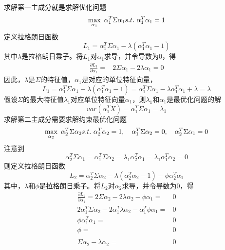 \documentclass[lang=cn,11pt,a4paper,cite=authoryear]{elegantpaper}
\begin{document}
求解第一主成分就是求解优化问题
\begin{equation}
\max_{\alpha_1}\ \alpha_1^T\Sigma\alpha_1\\
s.t.\ \alpha_1^T\alpha_1=1
\end{equation}
定义拉格朗日函数
\begin{equation}
L_1=\alpha_1^T\Sigma\alpha_1-\lambda(\alpha_1^T\alpha_1-1)
\end{equation}
其中$\lambda$是拉格朗日乘子。将$L_1$对$\alpha_1$求导，并令导数为$0$，得
\begin{equation}
\begin{aligned}
	\frac{\partial L_1}{\partial \alpha_1}=&2\Sigma\alpha_1-2\lambda\alpha_1=0
\end{aligned}
\end{equation}
因此，$\lambda$是$\Sigma$的特征值，$\alpha_1$是对应的单位特征向量，
\begin{equation}
L_1 =\alpha_1^T\Sigma\alpha_1-\lambda(\alpha_1^T\alpha_1-1)=\alpha_1^T\Sigma\alpha_1-\lambda\alpha_1^T\alpha_1+\lambda= \lambda
\end{equation}
假设$\Sigma$的最大特征值$\lambda_1$对应单位特征向量$\alpha_1$，则$\lambda_1$和$\alpha_1$是最优化问题的解
\begin{equation}
var(\alpha_1^TX)=\alpha_1^T\Sigma\alpha_1=\lambda_1
\end{equation}
求解第二主成分需要求解约束最优化问题
\begin{equation}
\max_{\alpha_2}\ \alpha_2^T\Sigma\alpha_2\\
s.t.\ \alpha_2^T\alpha_2=1, \quad \alpha_1^T\Sigma\alpha_2=0, \quad \alpha_2^T\Sigma\alpha_1=0
\end{equation}
注意到
\begin{equation}
\alpha_2^T\Sigma\alpha_1=\alpha_1^T\Sigma\alpha_2=\lambda_1\alpha_2^T\alpha_1=\lambda_1\alpha_1^T\alpha_2=0
\end{equation}
则定义拉格朗日函数
\begin{equation}
L_2=\alpha_2^T\Sigma\alpha_2-\lambda(\alpha_2^T\alpha_2-1)-\phi\alpha_2^T\alpha_1
\end{equation}
其中，$\lambda$和$\phi$是拉格朗日乘子。将$L_2$对$\alpha_2$求导，并令导数为$0$，得
\begin{equation}
\begin{aligned}
	\frac{\partial L_2}{\partial \alpha_1}=2\Sigma\alpha_2-2\lambda\alpha_2-\phi\alpha_1=&0\\
	2\alpha_1^T\Sigma\alpha_2-2\alpha_1^T\lambda\alpha_2-\alpha_1^T\phi\alpha_1=&0\\
	\phi\alpha_1^T\alpha_1=&0\\
	\phi=&0\\
	\\
	\Sigma\alpha_2-\lambda\alpha_2=&0\\
\end{aligned}
\end{equation}
\end{document}

